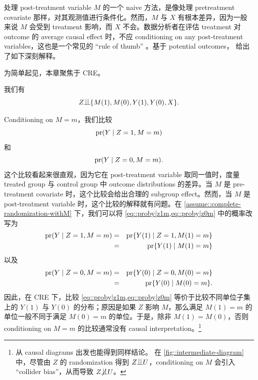 处理 post-treatment variable $M$ 的一个 naive 方法，是像处理 pretreatment covariate 那样，对其观测值进行条件化。然而，$M$ 与 $X$ 有根本差异，因为一般来说 $M$ 会受到 treatment 影响，而 $X$ 不会。数据分析者在评估 treatment 对 outcome 的 average causal effect 时，不应 conditioning on any post-treatment variables，这也是一个常见的 ``rule of thumb'' \citep{cochran1957analysis, rosenbaum1984consquences}。基于 potential outcomes，\citet{frangakis2002principal} 给出了如下深刻解释。

为简单起见，本章聚焦于 CRE。

\begin{assumption}
\label{assume::complete-randomization-withM}
我们有
$$
Z \ind  \{ M(1), M(0), Y(1), Y(0), X \} . 
$$
\end{assumption}

 
Conditioning on $M= m$，我们比较
\begin{equation}
\textup{pr}(Y\mid Z=1, M=m)\label{eq::proby|z1m}
\end{equation}
和
\begin{equation}
\textup{pr}(Y\mid Z=0, M=m).\label{eq::proby|z0m}
\end{equation}
这个比较看起来很直观，因为它在 post-treatment variable 取同一值时，度量 treated group 与 control group 中 outcome distributions 的差异。当 $M$ 是 pre-treatment covariate 时，这个比较会给出合理的 subgroup effect。然而，当 $M$ 是 post-treatment variable 时，这个比较的解释就有问题。在 \cref{assume::complete-randomization-withM} 下，我们可以将 \cref{eq::proby|z1m,eq::proby|z0m} 中的概率改写为
\begin{eqnarray*}
\textup{pr}(Y\mid Z=1, M=m)  &=& \textup{pr}\{ Y(1)\mid Z=1, M(1) = m  \} \\
&=& \textup{pr}\{ Y(1)\mid   M(1) = m  \}
\end{eqnarray*}
以及
\begin{eqnarray*}
\textup{pr}(Y\mid Z=0, M=m) &=&  \textup{pr}\{ Y(0)\mid Z=0, M(0) = m  \} \\
&=& \textup{pr}\{ Y(0)\mid   M(0) = m  \} . 
\end{eqnarray*}
因此，在 CRE 下，比较 \cref{eq::proby|z1m,eq::proby|z0m} 等价于比较不同单位子集上的 $Y(1)$ 与 $Y(0)$ 的分布；原因是如果 $Z$ 影响 $M$，那么满足 $M(1)=m$ 的单位一般不同于满足 $M(0)=m$ 的单位。于是，除非 $M(1)=M(0)$，否则 conditioning on $M=m$ 的比较通常没有 causal interpretation。\footnote{从 causal diagrams 出发也能得到同样结论。
在 \cref{fig::intermediate-diagram} 中，尽管由 $Z$ 的 randomization 得到 $Z\ind U$，conditioning on $M$ 会引入 ``collider bias''，从而导致 $Z\nind U$。
} 


